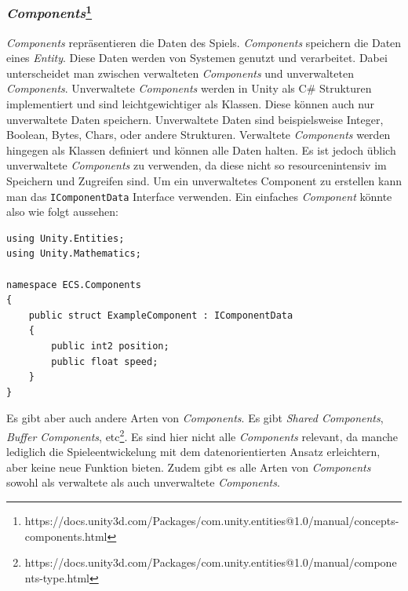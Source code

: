 \subsubsection{\textit{Components}\footnote{https://docs.unity3d.com/Packages/com.unity.entities@1.0/manual/concepts-components.html}} \label{components}
\textit{Components} repräsentieren die Daten des Spiels. \textit{Components} speichern die Daten eines \textit{Entity}. Diese Daten werden von Systemen genutzt und verarbeitet. Dabei unterscheidet man zwischen verwalteten \textit{Components} und unverwalteten \textit{Components}. Unverwaltete \textit{Components} werden in Unity als C\# Strukturen implementiert und sind leichtgewichtiger als Klassen. Diese können auch nur unverwaltete Daten speichern. Unverwaltete Daten sind beispielsweise Integer, Boolean, Bytes, Chars, oder andere Strukturen. Verwaltete \textit{Components} werden hingegen als Klassen definiert und können alle Daten halten. Es ist jedoch üblich unverwaltete \textit{Components} zu verwenden, da diese nicht so resourcenintensiv im Speichern und Zugreifen sind. Um ein unverwaltetes Component zu erstellen kann man das \texttt{IComponentData} Interface verwenden. Ein einfaches \textit{Component} könnte also wie folgt aussehen:
\begin{lstlisting}[style=code, caption={Beispiel unverwaltetes \textit{Component}}]
using Unity.Entities;
using Unity.Mathematics;

namespace ECS.Components
{
    public struct ExampleComponent : IComponentData
    {
        public int2 position;
        public float speed;
    }
}
\end{lstlisting}
Es gibt aber auch andere Arten von \textit{Components}. Es gibt \textit{Shared Components}, \textit{Buffer Components}, etc\footnote{https://docs.unity3d.com/Packages/com.unity.entities@1.0/manual/components-type.html}. Es sind hier nicht alle \textit{Components} relevant, da manche lediglich die Spieleentwickelung mit dem datenorientierten Ansatz erleichtern, aber keine neue Funktion bieten. Zudem gibt es alle Arten von \textit{Components} sowohl als verwaltete als auch unverwaltete \textit{Components}.\\
